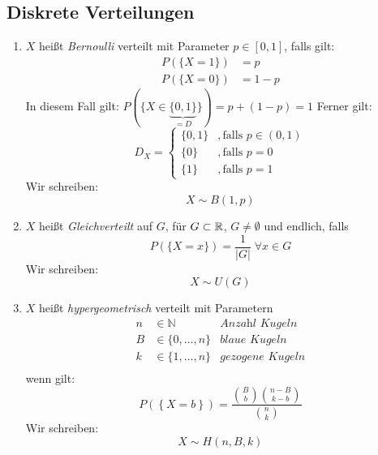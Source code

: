 \subsection{Diskrete Verteilungen}
\begin{enumerate}
    \item $X$ heißt \emph{Bernoulli} verteilt mit Parameter $p \in [0,1]$, falls gilt:
          \begin{align*}
              P(\{X=1\}) & = p   \\
              P(\{X=0\}) & = 1-p
          \end{align*}
          In diesem Fall gilt: $P(\{X\in\underbrace{\{0,1\}}_{=D}\}) = p+(1-p) = 1$
          Ferner gilt:
          \begin{equation*}
              D_X = \begin{cases}
                  \{0,1\} & , \text{falls } p \in (0,1) \\
                  \{0\}   & , \text{falls } p=0         \\
                  \{1\}   & , \text{falls } p=1
              \end{cases}
          \end{equation*}
          Wir schreiben:
          \begin{equation*}
              X \sim B(1,p)
          \end{equation*}

    \item $X$ heißt \emph{Gleichverteilt} auf $G$, für $G \subset \mathbb{R}$, $G \neq \emptyset$
          und endlich, falls
          \begin{equation*}
              P(\{X=x\}) = \frac{1}{|G|} \; \forall x \in G
          \end{equation*}
          Wir schreiben:
          \begin{equation*}
              X \sim U(G)
          \end{equation*}

    \item $X$ heißt \emph{hypergeometrisch} verteilt mit Parametern
          \begin{align*}
              n & \in \mathbb{N}      & \textit{Anzahl Kugeln}   \\
              B & \in \{0, \dots, n\} & \textit{blaue Kugeln}    \\
              k & \in \{1, \dots, n\} & \textit{gezogene Kugeln} \\
          \end{align*}
          wenn gilt:
          \begin{equation*}
              P\left(\left\{X=b\right\}\right)
              = \frac{\binom{B}{b} \binom{n-B}{k-b}}{\binom{n}{k}}
          \end{equation*}
          Wir schreiben:
          \begin{equation*}
              X \sim H(n,B,k)
          \end{equation*}


\end{enumerate}
